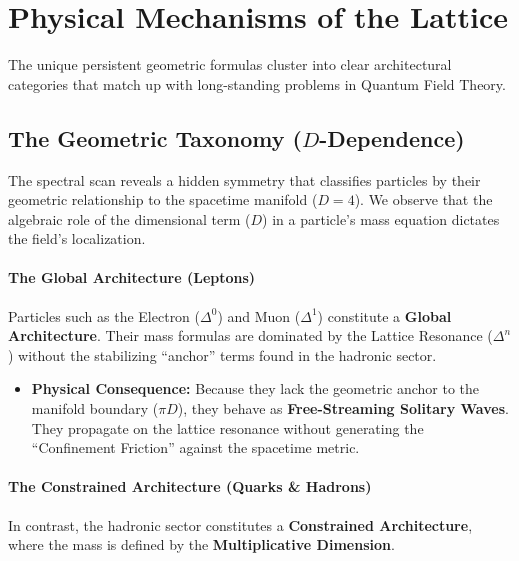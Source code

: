 \section{Physical Mechanisms of the Lattice}

The unique persistent geometric formulas cluster into clear architectural categories that match up with long-standing problems in Quantum Field Theory.

\subsection{The Geometric Taxonomy (\texorpdfstring{$D$}{D}-Dependence)}

The spectral scan reveals a hidden symmetry that classifies particles by their geometric relationship to the spacetime manifold ($D=4$). We observe that the algebraic role of the dimensional term ($D$) in a particle's mass equation dictates the field's localization.

\paragraph{The Global Architecture (Leptons)} 
Particles such as the Electron ($\Delta^0$) and Muon ($\Delta^1$) constitute a \textbf{Global Architecture}. Their mass formulas are dominated by the Lattice Resonance ($\Delta^n$) without the stabilizing ``anchor'' terms found in the hadronic sector.

\begin{itemize}
    \item \textbf{Physical Consequence:} Because they lack the geometric anchor to the manifold boundary ($\pi D$), they behave as \textbf{Free-Streaming Solitary Waves}. They propagate on the lattice resonance without generating the ``Confinement Friction'' against the spacetime metric.
\end{itemize}

\paragraph{The Constrained Architecture (Quarks \& Hadrons)} 
In contrast, the hadronic sector constitutes a \textbf{Constrained Architecture}, where the mass is defined by the \textbf{Multiplicative Dimension}.

